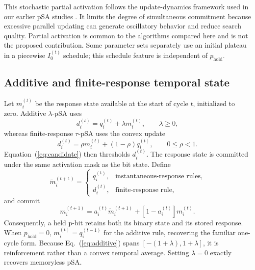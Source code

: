 \documentclass[aps,prapplied,reprint,superscriptaddress,longbibliography,floatfix]{revtex4-2}
\newcommand{\psa}{pSA}
\newcommand{\lpsa}{$\lambda$-pSA}
\newcommand{\tpsa}{$\tau$-pSA}
\begin{document}
This stochastic partial activation follows the update-dynamics framework used in our earlier pSA studies \cite{onizawa2024srep,onizawa2026landscape}.  It limits the degree of simultaneous commitment because excessive parallel updating can generate oscillatory behavior and reduce search quality.  Partial activation is common to the algorithms compared here and is not the proposed contribution.  Some parameter sets separately use an initial plateau in a piecewise $I_0^{(t)}$ schedule; this schedule feature is independent of $p_{\mathrm{hold}}$.

\subsection{Additive and finite-response temporal state}

Let $m_i^{(t)}$ be the response state available at the start of cycle $t$, initialized to zero.  Additive \lpsa{} uses
\begin{equation}
d_i^{(t)}=q_i^{(t)}+\lambda m_i^{(t)},
\qquad \lambda\geq0,
\label{eq:additive}
\end{equation}
whereas finite-response \tpsa{} uses the convex update
\begin{equation}
d_i^{(t)}=\rho m_i^{(t)}+(1-\rho)q_i^{(t)},
\qquad 0\leq\rho<1.
\label{eq:filter}
\end{equation}
Equation~(\ref{eq:candidate}) then thresholds $d_i^{(t)}$.  The response state is committed under the same activation mask as the bit state.  Define
\begin{equation}
\widetilde m_i^{(t+1)}=
\begin{cases}
q_i^{(t)}, & \text{instantaneous-response rules},\\
d_i^{(t)}, & \text{finite-response rule},
\end{cases}
\label{eq:responsecandidate}
\end{equation}
and commit
\begin{equation}
m_i^{(t+1)}=a_i^{(t)}\widetilde m_i^{(t+1)}
+[1-a_i^{(t)}]m_i^{(t)}.
\label{eq:responsecommit}
\end{equation}
Consequently, a held p-bit retains both its binary state and its stored response.  When $p_{\mathrm{hold}}=0$, $m_i^{(t)}=q_i^{(t-1)}$ for the additive rule, recovering the familiar one-cycle form.  Because Eq.~(\ref{eq:additive}) spans $[-(1+\lambda),1+\lambda]$, it is reinforcement rather than a convex temporal average.  Setting $\lambda=0$ exactly recovers memoryless \psa{}.
\end{document}
